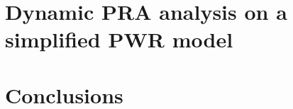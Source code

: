 \documentclass[pdf,ps2pdf,12pt]{INLreport}
\begin{document}
    \section{Dynamic PRA analysis on a simplified PWR model}
    

    \section{Conclusions}
    



    \clearpage
    \providecommand*{\phantomsection}{}
    \phantomsection

    
    




\end{document}
